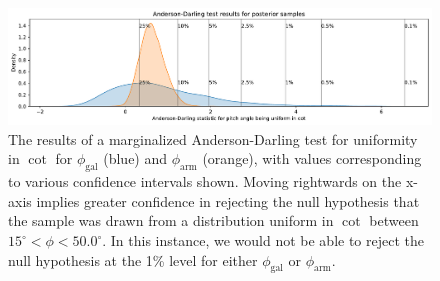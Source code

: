\begin{figure}
  \includegraphics[width=17.7cm]{plots/combined_cot_uniform_marginalized_tests.pdf}
  \caption{The results of a marginalized Anderson-Darling test for uniformity in $\cot$ for $\phi_\mathrm{gal}$ (blue) and $\phi_\mathrm{arm}$ (orange), with values corresponding to various confidence intervals shown. Moving rightwards on the x-axis implies greater confidence in rejecting the null hypothesis that the sample was drawn from a distribution uniform in $\cot$ between $15^\circ < \phi < 50.0^\circ$. In this instance, we would not be able to reject the null hypothesis at the 1\% level for either $\phi_\mathrm{gal}$ or $\phi_\mathrm{arm}$.}
  \label{fig:ad-cot-test}
\end{figure}
